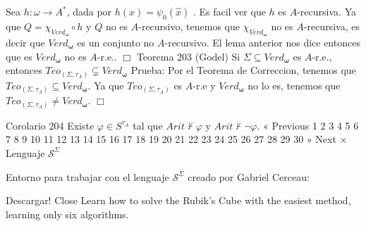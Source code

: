 Sea \(h:\omega \rightarrow A^{\ast }\), dada por \(h(x)=\psi _{0}(\widehat{x})\) . Es facil ver que \(h\) es \(A\)-recursiva. Ya que \(Q=\chi _{Verd_{\mathbf{ \omega }}}\circ h\) y \(Q\) no es \(A\)-recursivo, tenemos que \(\chi _{Verd_{ \mathbf{\omega }}}\) no es \(A\)-recursiva, es decir que \(Verd_{\mathbf{\omega } }\) es un conjunto no \(A\)-recursivo. El lema anterior nos dice entonces que es \(Verd_{\mathbf{\omega }}\) no es \(A\)-r.e.. \(\Box\)
Teorema 203 (Godel) Si \(\Sigma \subseteq Verd_{\mathbf{\omega }}\) es \(A\)-r.e., entonces \( Teo_{(\Sigma ,\tau _{A})}\subsetneq Verd_{\mathbf{\omega }}\)
Prueba: Por el Teorema de Correccion, tenemos que \(Teo_{(\Sigma ,\tau _{A})}\subseteq Verd_{\mathbf{\omega }}\). Ya que \(Teo_{(\Sigma ,\tau _{A})}\) es \(A\)-r.e y \(Verd_{\mathbf{\omega }}\) no lo es, tenemos que \(Teo_{(\Sigma ,\tau _{A})}\neq Verd_{\mathbf{\omega }}\). \(\Box\)

Corolario 204 Existe \(\varphi \in S^{\tau _{A}}\) tal que \(Arit\nvdash \varphi \) y \( Arit\nvdash \lnot \varphi \).
« Previous
1
2
3
4
5
6
7
8
9
10
11
12
13
14
15
16
17
18
19
20
21
22
23
24
25
26
27
28
29
30
» Next
×
Lenguaje \(\mathcal{S}^{\Sigma }\)

Entorno para trabajar con el lenguaje \(\mathcal{S}^{\Sigma }\) creado por Gabriel Cerceau:

Descargar!
Close
Learn how to solve the Rubik's Cube with the easiest method, learning only six algorithms.
